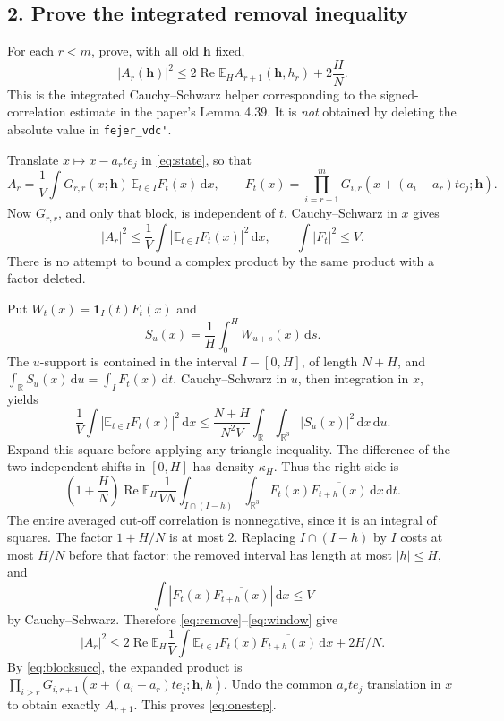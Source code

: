 \documentclass[11pt]{article}
\newcommand{\R}{\mathbb R}
\newcommand{\E}{\mathbb E}
\newcommand{\dd}{\,\mathrm d}
\newcommand{\idname}[1]{\nolinkurl{#1}}
\theoremstyle{definition}\newtheorem{definition}[lemma]{Definition}
\begin{document}
\subsection*{2. Prove the integrated removal inequality}
For each $r<m$, prove, with all old $\mathbf h$ fixed,
\begin{equation}\label{eq:onestep}
 |A_r(\mathbf h)|^2
 \leq 2\operatorname{Re}\E_H A_{r+1}(\mathbf h,h_r)
      +2\frac HN.
\end{equation}
This is the integrated Cauchy--Schwarz helper corresponding to the signed-correlation estimate in the paper's Lemma 4.39. It is \emph{not} obtained by deleting the absolute value in \idname{fejer_vdc'}.

Translate $x\mapsto x-a_rte_j$ in \eqref{eq:state}, so that
\[
 A_r=\frac1V\int G_{r,r}(x;\mathbf h)\,
                  \E_{t\in I}F_t(x)\dd x,
 \qquad
 F_t(x)=\prod_{i=r+1}^m
 G_{i,r}(x+(a_i-a_r)te_j;\mathbf h).
\]
Now $G_{r,r}$, and only that block, is independent of $t$. Cauchy--Schwarz in $x$ gives
\begin{equation}\label{eq:remove}
 |A_r|^2\leq\frac1V\int\left|\E_{t\in I}F_t(x)\right|^2\dd x,
 \qquad \int|F_t|^2\leq V.
\end{equation}
There is no attempt to bound a complex product by the same product with a factor deleted.

Put $W_t(x)=\mathbf1_I(t)F_t(x)$ and
\[
 S_u(x)=\frac1H\int_0^H W_{u+s}(x)\dd s.
\]
The $u$-support is contained in the interval $I-[0,H]$, of length $N+H$, and
$\int_\R S_u(x)\dd u=\int_I F_t(x)\dd t$. Cauchy--Schwarz in $u$, then integration in $x$, yields
\begin{equation}\label{eq:window}
 \frac1V\int\left|\E_{t\in I}F_t(x)\right|^2\dd x
 \leq\frac{N+H}{N^2V}\int_\R\int_{\R^3}|S_u(x)|^2\dd x\dd u.
\end{equation}
Expand this square before applying any triangle inequality. The difference of the two independent shifts in $[0,H]$ has density $\kappa_H$. Thus the right side is
\[
 \left(1+\frac HN\right)\operatorname{Re}\E_H
 \frac1{VN}\int_{I\cap(I-h)}\int_{\R^3}
          F_t(x)\overline{F_{t+h}(x)}\dd x\dd t.
\]
The entire averaged cut-off correlation is nonnegative, since it is an integral of squares. The factor $1+H/N$ is at most $2$. Replacing $I\cap(I-h)$ by $I$ costs at most $H/N$ before that factor: the removed interval has length at most $|h|\leq H$, and
\[
 \int|F_t(x)\overline{F_{t+h}(x)}|\dd x\leq V
\]
by Cauchy--Schwarz. Therefore \eqref{eq:remove}--\eqref{eq:window} give
\[
 |A_r|^2\leq2\operatorname{Re}\E_H
 \frac1V\int\E_{t\in I}F_t(x)\overline{F_{t+h}(x)}\dd x
 +2H/N.
\]
By \eqref{eq:blocksucc}, the expanded product is
$\prod_{i>r}G_{i,r+1}(x+(a_i-a_r)te_j;\mathbf h,h)$. Undo the common $a_rt e_j$ translation in $x$ to obtain exactly $A_{r+1}$. This proves \eqref{eq:onestep}.
\end{document}

